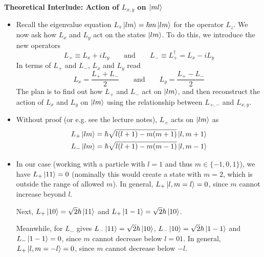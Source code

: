 \documentclass[11pt, a4paper]{article}
\newcommand{\eqtext}[1]{\qquad \text{#1} \qquad}
\begin{document}
\textbf{Theoretical Interlude: Action of $ L_{x, y} $ on $ \ket{ml} $}
\begin{itemize}
	\item Recall the eigenvalue equation $ L_{z} \ket{lm} = \hbar m \ket{lm} $ for the operator $ L_{z} $. We now ask how $ L_{x} $ and $ L_{y} $ act on the states $ \ket{lm} $. To do this, we introduce the new operators
	\begin{equation*}
		L_{+} \equiv L_{x} + i L_{y} \eqtext{and} L_{-} \equiv L_{+}^{\dagger} = L_{x} - i L_{y}
	\end{equation*}
	In terms of $ L_{+} $ and $ L_{-} $, $ L_{x} $ and $ L_{y} $ read
	\begin{equation*}
		L_{x} = \frac{L_{+} + L_{-}}{2} \eqtext{and} L_{y} = \frac{L_{+} - L_{-}}{2}
	\end{equation*}
	The plan is to find out how $ L_{+} $ and $ L_{-} $ act on $ \ket{lm} $, and then reconstruct the action of $ L_{x} $ and $ L_{y} $ on $ \ket{lm} $ using the relationship between $ L_{+, -} $ and $ L_{x, y} $. 
	
	\item Without proof (or e.g. see the lecture notes), $ L_{+} $ acts on $ \ket{lm} $ as
	\begin{align*}
		&L_{+}\ket{lm} = \hbar \sqrt{l (l+1) - m(m+1)} \ket{l, m+1} \\
		&L_{-}\ket{lm} = \hbar \sqrt{l (l+1) - m(m-1)} \ket{l, m-1} 
	\end{align*}
	
	\item In our case (working with a particle with $ l = 1 $ and thus $ m \in \{-1, 0, 1\} $), we have $ L_{+}\ket{11} = 0 $ (nominally this would create a state with $ m = 2 $, which is outside the range of allowed $ m $). In general, $ L_{+}\ket{l, m=l} = 0 $, since $ m $  cannot increase beyond $ l $. 
	
	Next, $ L_{+}\ket{10} = \sqrt{2}\hbar \ket{11} $ and $ L_{+}\ket{1 -1} = \sqrt{2}\hbar \ket{10} $.
	
	Meanwhile, for $ L_{-} $ gives $ L_{-}\ket{11} = \sqrt{2}\hbar \ket{10} $, $ L_{-}\ket{10} = \sqrt{2}\hbar \ket{1-1} $ and $ L_{-}\ket{1-1} = 0 $, since $ m $ cannot decrease below $ l = 01 $. In general, $ L_{+}\ket{l, m=-l} = 0 $, since $ m $  cannot decrease below $ -l $. 
	
\end{itemize}
\end{document}
